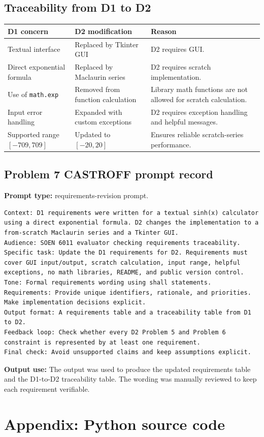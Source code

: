 \documentclass[11pt]{article}
\begin{document}
\subsection{Traceability from D1 to D2}

\begin{center}
\begin{tabular}{p{}p{}p{}}
\toprule
\textbf{D1 concern} & \textbf{D2 modification} & \textbf{Reason} \\
\midrule
Textual interface & Replaced by Tkinter GUI & D2 requires GUI. \\
Direct exponential formula & Replaced by Maclaurin series & D2 requires scratch implementation. \\
Use of \texttt{math.exp} & Removed from function calculation & Library math functions are not allowed for scratch calculation. \\
Input error handling & Expanded with custom exceptions & D2 requires exception handling and helpful messages. \\
Supported range $[-709,709]$ & Updated to $[-20,20]$ & Ensures reliable scratch-series performance. \\
\bottomrule
\end{tabular}
\end{center}

\subsection{Problem 7 CASTROFF prompt record}

\textbf{Prompt type:} requirements-revision prompt.

\begin{lstlisting}[style=textstyle]
Context: D1 requirements were written for a textual sinh(x) calculator using a direct exponential formula. D2 changes the implementation to a from-scratch Maclaurin series and a Tkinter GUI.
Audience: SOEN 6011 evaluator checking requirements traceability.
Specific task: Update the D1 requirements for D2. Requirements must cover GUI input/output, scratch calculation, input range, helpful exceptions, no math libraries, README, and public version control.
Tone: Formal requirements wording using shall statements.
Requirements: Provide unique identifiers, rationale, and priorities. Make implementation decisions explicit.
Output format: A requirements table and a traceability table from D1 to D2.
Feedback loop: Check whether every D2 Problem 5 and Problem 6 constraint is represented by at least one requirement.
Final check: Avoid unsupported claims and keep assumptions explicit.
\end{lstlisting}

\textbf{Output use:} The output was used to produce the updated requirements table and the D1-to-D2 traceability table. The wording was manually reviewed to keep each requirement verifiable.

\section{Appendix: Python source code}


\end{document}
